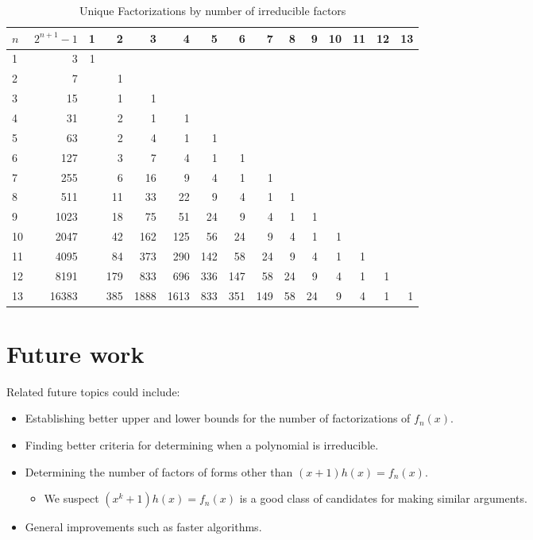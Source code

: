 \documentclass{article}
\begin{document}
    \begin{table}[h!]
    \centering
    \caption{Unique Factorizations by number of irreducible factors}
    \label{tab:data}
    \begin{tabular}{|l|*{14}{r|}}
        \hline
        $n$  & $2^{n+1}-1$ & 1 & 2 & 3 & 4 & 5 & 6 & 7 & 8 & 9 & 10 & 11 & 12 & 13 \\
        \hline
        1  & 3 & 1 & & & & & & & & & & & & \\
        \hline
        2  & 7 & & 1 & & & & & & & & & & & \\
        \hline
        3  & 15 & & 1 & 1 & & & & & & & & & & \\
        \hline
        4  & 31 & & 2 & 1 & 1 & & & & & & & & & \\
        \hline
        5  & 63 & & 2 & 4 & 1 & 1 & & & & & & & & \\
        \hline
        6  & 127 & & 3 & 7 & 4 & 1 & 1 & & & & & & & \\
        \hline
        7  & 255 & & 6 & 16 & 9 & 4 & 1 & 1 & & & & & & \\
        \hline
        8  & 511 & & 11 & 33 & 22 & 9 & 4 & 1 & 1 & & & & & \\
        \hline
        9  & 1023 & & 18 & 75 & 51 & 24 & 9 & 4 & 1 & 1 & & & & \\
        \hline
        10  & 2047 & & 42 & 162 & 125 & 56 & 24 & 9 & 4 & 1 & 1 & & & \\
        \hline
        11 & 4095 & & 84 & 373 & 290 & 142 & 58 & 24 & 9 & 4 & 1 & 1 & & \\
        \hline
        12 & 8191 & & 179 & 833 & 696 & 336 & 147 & 58 & 24 & 9 & 4 & 1 & 1 & \\
        \hline
        13 & 16383 & & 385 & 1888 & 1613 & 833 & 351 & 149 & 58 & 24 & 9 & 4 & 1 & 1 \\
        \hline
    \end{tabular}
\end{table}

\pagebreak
\section{Future work}
Related future topics could include:
\begin{itemize}
    \item Establishing better upper and lower bounds for the number of factorizations of $f_n(x)$.
    \item Finding better criteria for determining when a polynomial is irreducible.
    \item Determining the number of factors of forms other than $(x + 1)h(x) = f_n(x)$.
    
    \begin{itemize}
        \item We suspect $(x^k + 1)h(x) = f_n(x)$ is a good class of candidates for making similar arguments.
    \end{itemize}
    \item General improvements such as faster algorithms.
\end{itemize}

\pagebreak


\nocite{*}
\end{document}
